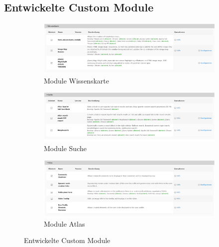 \subsection{Entwickelte Custom Module}\label{sub:custom_modules}
\vspace{-1em}
\begin{figure}[H]
	\centering
	\begin{subfigure}[b]{0.48\textwidth}
		\centering
		\includegraphics[width=\linewidth]{images/modules_knowledgemap}
		\caption{Module Wissenskarte}
		\label{fig:modules_knowledgemap}
	\end{subfigure}
	\begin{subfigure}[b]{0.48\textwidth}
		\centering
		\includegraphics[width=\linewidth]{images/modules_search}
		\caption{Module Suche}
		\label{fig:modules_search}
	\end{subfigure}
	\begin{subfigure}[b]{0.48\textwidth}
		\centering
		\includegraphics[width=\linewidth]{images/modules_atlas}
		\caption{Module Atlas}
		\label{fig:modules_atlas}
	\end{subfigure}
	\caption{Entwickelte Custom Module}
	\label{fig:modules_all}
\end{figure}
\vspace{-1em}


